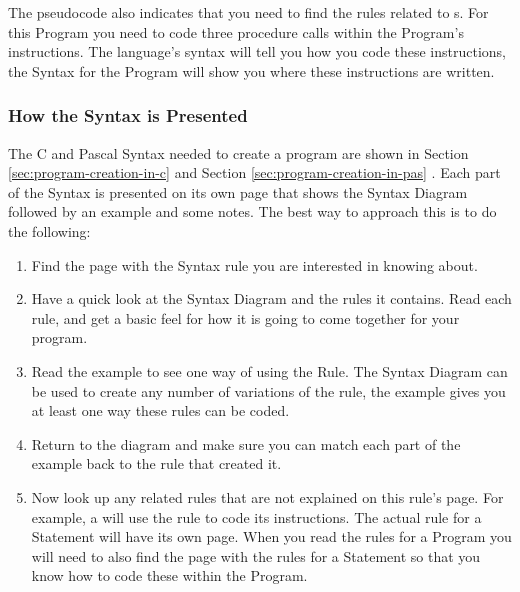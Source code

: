 
The pseudocode also indicates that you need to find the rules related to s. For this Program you need to code three procedure calls within the Program's instructions. The language's syntax will tell you how you code these instructions, the Syntax for the Program will show you where these instructions are written.


\subsubsection{How the Syntax is Presented} %
\label{ssub:how_the_syntax_is_presented}

The C and Pascal Syntax needed to create a program are shown in Section \ref{sec:program-creation-in-c}  and Section \ref{sec:program-creation-in-pas} . Each part of the Syntax is presented on its own page that shows the Syntax Diagram followed by an example and some notes. The best way to approach this is to do the following:

\begin{enumerate}
  \item Find the page with the Syntax rule you are interested in knowing about.
  \item Have a quick look at the Syntax Diagram and the rules it contains. Read each rule, and get a basic feel for how it is going to come together for your program.
  \item Read the example to see one way of using the Rule. The Syntax Diagram can be used to create any number of variations of the rule, the example gives you at least one way these rules can be coded.
  \item Return to the diagram and make sure you can match each part of the example back to the rule that created it.
  \item Now look up any related rules that are not explained on this rule's page. For example, a  will use the  rule to code its instructions. The actual rule for a Statement will have its own page. When you read the rules for a Program you will need to also find the page with the rules for a Statement so that you know how to code these within the Program.
\end{enumerate}

